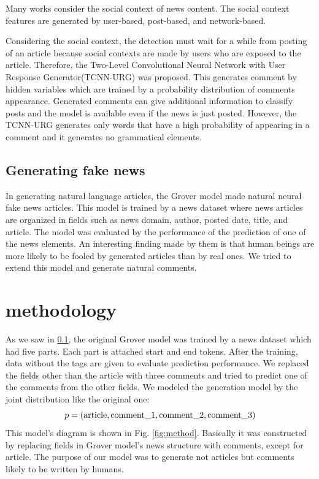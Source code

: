 \documentclass[conference]{IEEEtran}
\begin{document}
Many works consider the social context of news content.
The social context features are generated by user-based\cite{Castillo:2011:ICT:1963405.1963500,8397048,DBLP:journals/corr/abs-1904-13355}, 
post-based\cite{Yang2019UnsupervisedFN,Tacchini2017SomeLI,Jin:2016:NVE:3016100.3016318},
 and network-based\cite{Wu:2018:TFF:3159652.3159677,DBLP:journals/corr/abs-1902-06673}.

Considering the social context, the detection must wait for a while from posting of an article because social contexts are made by users who are exposed to the article.
Therefore, the Two-Level Convolutional Neural Network with User Response Generator(TCNN-URG) was proposed\cite{ijcai2018-533}.
This generates comment by hidden variables which are trained by a probability distribution of comments appearance.
Generated comments can give additional information to classify posts and the model is available even if the news is just posted.
However, the TCNN-URG generates only words that have a high probability of appearing in a comment and it generates no grammatical elements.

\subsection{Generating fake news}
\label{subsec:generate}
In generating natural language articles, the Grover model made natural neural fake news articles\cite{NIPS2019_9106}.
This model is trained by a news dataset where news articles are organized in fields such as news domain, author, posted date, title, and article.
The model was evaluated by the performance of the prediction of one of the news elements.
An interesting finding made by them is that human beings are more likely to be fooled by generated articles than by real ones.
We tried to extend this model and generate natural comments.
\section{methodology}
As we saw in \ref{subsec:generate}, the original Grover model was trained by a news dataset which had five parts.
Each part is attached start and end tokens.
After the training, data without the tags are given to evaluate prediction performance.
We replaced the fields other than the article with three comments and tried to predict one of the comments from the other fields.
We modeled the generation model by the joint distribution like the original one:
\begin{equation}
    \label{eq:joint_distri}
    p = (\rm{article}, \rm{comment\_1}, \rm{comment\_2}, \rm{comment\_3})
\end{equation}
This model's diagram is shown in Fig. \ref{fig:method}.
Basically it was constructed by replacing fields in Grover model’s news structure with comments, except for article.
The purpose of our model was to generate not articles but comments likely to be written by humans.
\end{document}
